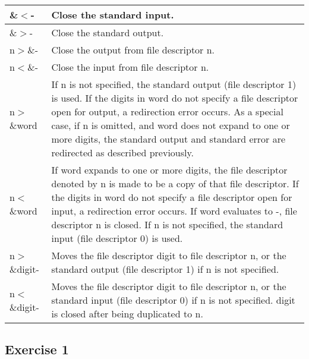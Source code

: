 \documentclass{report}
\begin{document}
\begin{longtable}{|l|p{10cm}|}
        \hline
        \&$<$- & Close the standard input. \\
        \hline
        \&$>$- & Close the standard output. \\
        \hline
        n$>$\&- & Close the output from file descriptor n. \\
        \hline
        n$<$\&- & Close the input from file descriptor n. \\
        \hline
        n$>$\&word & If n is not specified, the standard output (file descriptor 1) is used. If the digits in word do not specify a file descriptor open for output, a redirection error occurs. As a special case, if n is omitted, and word does not expand to one or more digits, the standard output and standard error are redirected as described previously. \\
        \hline
        n$<$\&word & If word expands to one or more digits, the file descriptor denoted by n is made to be a copy of that file descriptor. If the digits in word do not specify a file descriptor open for input, a redirection error occurs. If word evaluates to -, file descriptor n is closed. If n is not specified, the standard input (file descriptor 0) is used. \\
        \hline
        n$>$\&digit- & Moves the file descriptor digit to file descriptor n, or the standard output (file descriptor 1) if n is not specified. \\
        \hline
        n$<$\&digit- & Moves the file descriptor digit to file descriptor n, or the standard input (file descriptor 0) if n is not specified. digit is closed after being duplicated to n. \\
        \hline
    \end{longtable}


























    \pagebreak 
    \bigbreak \noindent 
    \subsection{Exercise 1}
    \bigbreak \noindent 
\end{document}
